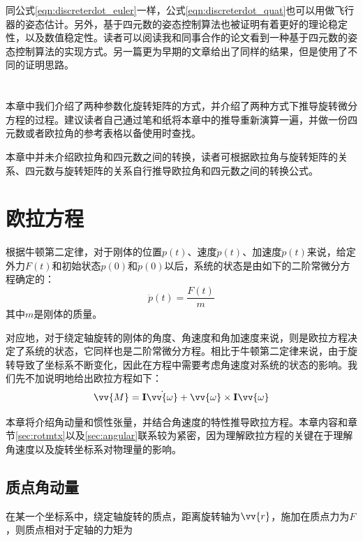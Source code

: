 \documentclass[11pt]{article}
\begin{document}
同公式\ref{eqn:discreterdot_euler}一样，公式\ref{eqn:discreterdot_quat}也可以用做飞行器的姿态估计。另外，基于四元数的姿态控制算法也被证明有着更好的理论稳定性，以及数值稳定性。读者可以阅读我和同事合作的论文\cite{7139416}看到一种基于四元数的姿态控制算法的实现方式。另一篇更为早期的文章\cite{5717652}给出了同样的结果，但是使用了不同的证明思路。
\ \\
\ \\
\ \\
本章中我们介绍了两种参数化旋转矩阵的方式，并介绍了两种方式下推导旋转微分方程的过程。建议读者自己通过笔和纸将本章中的推导重新演算一遍，并做一份四元数或者欧拉角的参考表格以备使用时查找。

本章中并未介绍欧拉角和四元数之间的转换，读者可根据欧拉角与旋转矩阵的关系、四元数与旋转矩阵的关系自行推导欧拉角和四元数之间的转换公式。

\section{欧拉方程}\label{sec:euler}
​根据牛顿第二定律，对于刚体的位置$p(t)$、速度$\dot{p}(t)$、加速度$\ddot{p}(t)$来说，给定外力$F(t)$和初始状态$p(0)$和$\dot{p}(0)$以后，系统的状态是由如下的二阶常微分方程确定的：
\begin{equation}\label{eqn:newton2}
\ddot{p}(t) = \frac{F(t)}{m}
\end{equation}
其中$m$是刚体的质量。

对应地，对于绕定轴旋转的刚体的角度、角速度和角加速度来说，则是欧拉方程决定了系统的状态，它同样也是二阶常微分方程。相比于牛顿第二定律来说，由于旋转导致了坐标系不断变化，因此在方程中需要考虑角速度对系统的状态的影响。我们先不加说明地给出欧拉方程如下：
\begin{equation}
\vv{M} = {\bf I}\dot{\vv{\omega}} + \vv{\omega} \times {\bf I}\vv{\omega}
\end{equation}


本章将介绍角动量和惯性张量，并结合角速度的特性推导欧拉方程。本章内容和章节\ref{sec:rotmtx}以及\ref{sec:angular}联系较为紧密，因为理解欧拉方程的关键在于理解角速度以及旋转坐标系对物理量的影响。
\subsection{质点角动量}
在某一个坐标系中，绕定轴旋转的质点，距离旋转轴为$\vv{r}$，施加在质点力为$F$，则质点相对于定轴的力矩为
\end{document}
